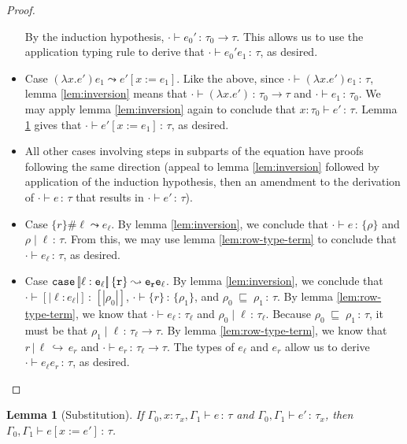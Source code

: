\documentclass{article}
\newtheorem{lemma}{Lemma}
\newcommand{\variant}[1]{[\!|#1|\!]}
\newcommand{\case}[2]{\tt{case}\,#1\,#2}
\newcommand{\hastp}[3]{#1 \vdash #2 \,:\, #3}
\newcommand{\haslbl}[3]{#1\;|\;#2\,:\, #3}
\newcommand{\caseVarRcd}[3]{#1 \;\sqsubseteq\; #2 \,:\, #3}
\newcommand{\haslbltm}[3]{#1\,|\,#2\,\hookrightarrow\, #3}
\newcommand{\step}[2]{#1 \leadsto #2}
\begin{document}
\begin{proof}
\begin{itemize}
    By the induction hypothesis, \(\hastp \cdot {e_0'} {\tau_0 \to \tau}\). This
    allows us to use the application typing rule to derive that \(\hastp \cdot
    {e_0' e_1} \tau\), as desired.
  \item Case \(\step {(\lambda x. e')e_1} {e'[x:=e_1]}\). Like the above, since
    \(\hastp \cdot {(\lambda x.e') e_1} \tau\), lemma \ref{lem:inversion} means
    that \(\hastp \cdot {(\lambda x.e')} {\tau_0 \to \tau}\) and \(\hastp \cdot
    {e_1} {\tau_0}\). We may apply lemma \ref{lem:inversion} again to conclude
    that \(\hastp {x : \tau_0} {e'} \tau\). Lemma \ref{lem:substitution} gives
    that \(\hastp \cdot {e'[x:=e_1]} \tau\), as desired.
  \item All other cases involving steps in subparts of the equation have proofs
    following the same direction (appeal to lemma \ref{lem:inversion} followed
    by application of the induction hypothesis, then an amendment to the
    derivation of \(\hastp \cdot e \tau\) that results in \(\hastp \cdot {e'}
    \tau\)).
  \item Case \(\step {\{r\} \# \ell} {e_\ell}\). By lemma \ref{lem:inversion},
    we conclude that \(\hastp \cdot e {\{\rho\}}\) and \(\haslbl \rho \ell
    \tau\). From this, we may use lemma \ref{lem:row-type-term} to conclude that
    \(\hastp \cdot {e_\ell} \tau\), as desired.
  \item Case \(\step {\case {\variant {\ell : e_\ell}} {\{r\}}} {e_r e_\ell}\).
    By lemma \ref{lem:inversion}, we conclude that \(\hastp \cdot {\variant
      {\ell : e_\ell}} {\variant {\rho_0}}\), \(\hastp \cdot {\{r\}}
    {\{\rho_1\}}\), and \(\caseVarRcd {\rho_0} {\rho_1} \tau\). By lemma
    \ref{lem:row-type-term}, we know that \(\hastp \cdot {e_\ell} {\tau_\ell}\)
    and \(\haslbl {\rho_0} \ell {\tau_\ell}\). Because \(\caseVarRcd {\rho_0}
    {\rho_1} \tau\), it must be that \(\haslbl {\rho_1} \ell {\tau_\ell \to
      \tau}\). By lemma \ref{lem:row-type-term}, we know that \(\haslbltm r \ell
    {e_r}\) and \(\hastp \cdot {e_r} {\tau_\ell \to \tau}\). The types of
    \(e_\ell\) and \(e_r\) allow us to derive \(\hastp \cdot {e_\ell e_r}
    \tau\), as desired.
\end{itemize}

\end{proof}

\begin{lemma}[Substitution] \label{lem:substitution} If \(\hastp {\Gamma_0, x :
    \tau_x, \Gamma_1} e \tau\) and \(\hastp {\Gamma_0, \Gamma_1} {e'}
  {\tau_x}\), then \(\hastp {\Gamma_0, \Gamma_1} {e[x:=e']} \tau\).
\end{lemma}
\end{document}
